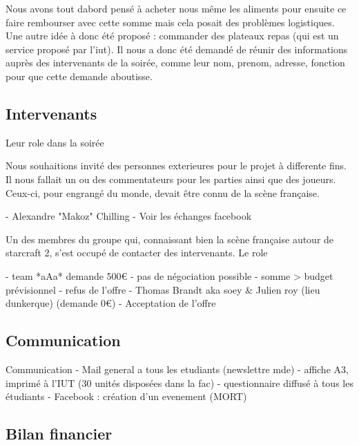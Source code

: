   Nous avons tout dabord pensé à acheter nous même les aliments pour
  ensuite ce faire rembourser avec cette somme mais cela posait des
  problèmes logistiques. Une autre idée à donc été proposé : commander des
  plateaux repas (qui est un service proposé par l'iut). Il nous a donc
  été demandé de réunir des informations auprès des intervenants de la
  soirée, comme leur nom, prenom, adresse, fonction pour que cette demande
  aboutisse.

\subsection{Intervenants}%
\label{sub:intervenants}

Leur role dans la soirée

  Nous souhaitions invité des personnes exterieures pour le projet à
  differente fins. Il nous fallait un ou des commentateurs pour les
  parties ainsi que des joueurs. Ceux-ci, pour engrangé du monde, devait
  être connu de la scène française.


- Alexandre "Makoz" Chilling
  - Voir les échanges facebook

Un des membres du groupe qui, connaissant bien la scène française
autour de starcraft 2, s'est occupé de contacter des intervenants. Le
role

- team *aAa* demande 500€
                - pas de négociation possible
                - somme > budget prévisionnel
                - refus de l'offre
- Thomas Brandt aka soey & Julien roy (lieu dunkerque) (demande 0€)
    - Acceptation de l'offre


\subsection{Communication}%
\label{sub:communication}

Communication
        - Mail general a tous les etudiants (newslettre mde)
        - affiche A3, imprimé à l'IUT (30 unités disposées dans la fac)
        - questionnaire diffusé à tous les étudiants
        - Facebook : création d'un evenement (MORT)

\subsection{Bilan financier}%
\label{sub:bilan_financier}

